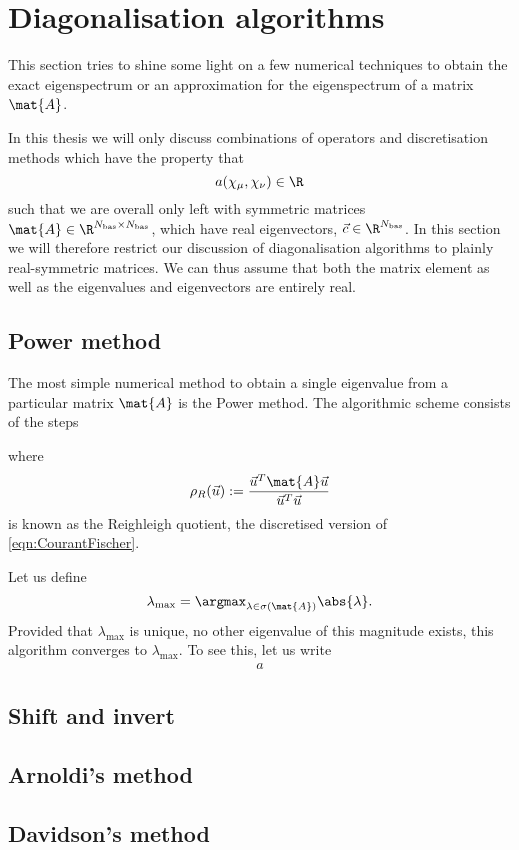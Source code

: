 \section{Diagonalisation algorithms}
\label{sec:DiagAlgos}

This section tries to shine some light on a few numerical techniques
to obtain the exact eigenspectrum or an approximation for the eigenspectrum
of a matrix $\mat{A}$.

In this thesis we will only discuss combinations of operators
and discretisation methods which have the property
that
\[ a(\chi_\mu, \chi_\nu) \in \R \]
such that we are overall only left with symmetric matrices
$\mat{A} \in \R^{\Nbas \times \Nbas}$,
which have real eigenvectors, \ie $\vec{c} \in \R^{\Nbas}$.
In this section we will therefore restrict our discussion
of diagonalisation algorithms to plainly real-symmetric matrices.
We can thus assume that both the matrix element
as well as the eigenvalues and eigenvectors are entirely real.

\subsection{Power method}
The most simple numerical method to obtain
a single eigenvalue from a particular matrix $\mat{A}$
is the Power method.
The algorithmic scheme consists of the steps


where
\[ \rho_R(\vec{u}) := \frac{\vec{u}^T \mat{A} \vec{u}}{\vec{u}^T \vec{u}} \]
is known as the Reighleigh quotient,
the discretised version of \eqref{eqn:CourantFischer}.

Let us define
\[ \lambda_\text{max} = \argmax_{\lambda \in \sigma(\mat{A})} \abs{\lambda}. \]
Provided that $\lambda_\text{max}$ is unique,
\ie no other eigenvalue of this magnitude exists,
this algorithm converges to $\lambda_\text{max}$.
To see this, let us write
\begin{align}
	a
\end{align}




\subsection{Shift and invert}

\subsection{Arnoldi's method}

\subsection{Davidson's method}
